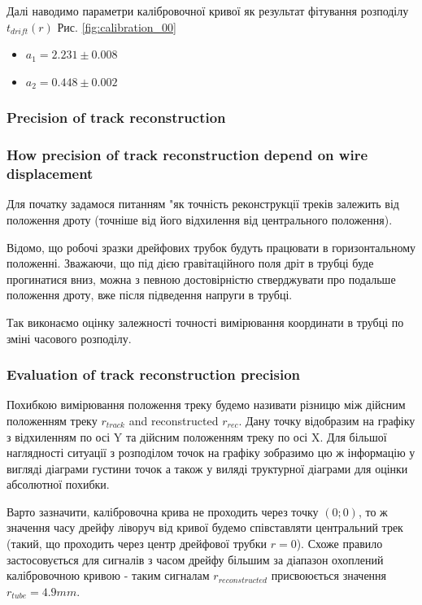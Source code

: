 \documentclass[]{article}
\begin{document}
	Далі наводимо параметри калібровочної кривої як результат фітування розподілу $t_{drift}(r)$ Рис. \ref{fig:calibration_00} 
	
	\begin{itemize}
		\item $a_1 = 2.231 \pm 0.008$
		\item $a_2 = 0.448 \pm 0.002$
	\end{itemize}
	
	\subsubsection{Precision of track reconstruction}	

	\subsubsection{ How precision of track reconstruction depend on wire displacement }
	Для початку задамося питанням "як точність реконструкції треків залежить 	від положення дроту (точніше від його відхилення від центрального положення).
	
	Відомо, що робочі зразки дрейфових трубок будуть працювати в горизонтальному положенні. Зважаючи, що під дією гравітаційного поля дріт в трубці буде прогинатися вниз, можна з певною достовірністю стверджувати про подальше положення дроту, вже після підведення напруги в трубці.
	
	Так виконаємо оцінку залежності точності вимірювання координати в трубці  по зміні часового розподілу.
	
	
	\subsubsection{Evaluation of track reconstruction precision}
	Похибкою вимірювання положення треку будемо називати різницю між дійсним положенням треку $r_{track}$ and reconstructed $r_{rec}$. Дану точку відобразим на графіку з відхиленням по осі Y та дійсним положенням треку по осі X. Для більшої наглядності ситуації з розподілом точок на графіку зобразимо цю ж інформацію у вигляді діаграми густини точок а також у виляді труктурної діаграми для  оцінки абсолютної похибки.
	
	Варто зазначити, калібровочна крива не проходить через точку $(0;0)$, то ж значення часу дрейфу ліворуч від кривої будемо співставляти центральний трек (такий, що проходить через центр дрейфової трубки $r=0$). Схоже правило застосовується для сигналів з часом дрейфу більшим за діапазон охоплений калібровочною кривою - таким сигналам $r_{reconstructed}$ присвоюється значення $r_{tube} = 4.9mm$.
	
\end{document}
